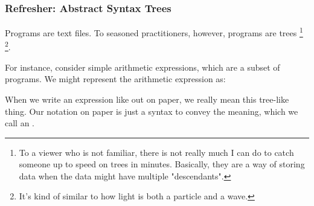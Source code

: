 \documentclass[aspectratio=169, handout]{beamer}
\begin{document}
 \begin{frame}[fragile]
   \frametitle{Refresher: Abstract Syntax Trees}

   Programs are text files. To seasoned practitioners, however, programs are trees
   \footnote{To a viewer who is not familiar, there is not really much I can do to
   catch someone up to speed on trees in minutes. Basically, they are a way of storing
   data when the data might have multiple "descendants".}
   \footnote{It's kind of similar to how light is both a particle and a wave.}.

   \pause
   \vspace{\fill}

   \begin{minipage}{0.65\textwidth}
    For instance, consider simple arithmetic expressions, which are a subset of
    programs. We might represent the arithmetic expression  as:

    When we write an expression like  out on paper, we really
    mean this tree-like thing. Our notation on paper is just a syntax to convey
    the meaning, which we call an .
   \end{minipage}
   \hspace{\fill}
   \begin{minipage}{0.3\textwidth}
    \begin{center}
    \end{center}
  \end{minipage}

\end{frame}
\end{document}
